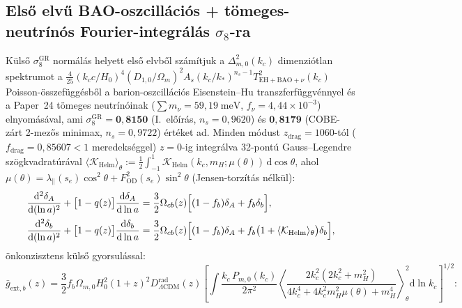 \documentclass[11pt,a4paper]{article}
\begin{document}
\subsection{Első elvű BAO-oszcillációs + tömeges-neutrínós Fourier-integrálás \texorpdfstring{$\sigma_8$}{sigma\_8}-ra}
Külső $\sigma_8^{\mathrm{GR}}$ normálás helyett első elvből számítjuk a $\Delta_{m,0}^2(k_c)$ dimenziótlan spektrumot a $\frac{4}{25}(k_c c/H_0)^4\allowbreak(D_{1,0}/\Omega_m)^2 A_s(k_c/k_*)^{n_s-1}T_{\mathrm{EH+BAO}+\nu}^2(k_c)$ Poisson-összefüggésből a barion-oszcillációs Eisenstein--Hu transzferfüggvénnyel \cite{EisensteinHu1998} és a Paper~24 tömeges neutrínóinak ($\sum m_\nu = 59{,}19\;\mathrm{meV}$, $f_\nu = 4{,}44\times 10^{-3}$) elnyomásával, ami $\sigma_8^{\mathrm{GR}} = \mathbf{0{,}8150}$ (I.~előírás, $n_s = 0{,}9620$) és $\mathbf{0{,}8179}$ (COBE-zárt 2-mezős minimax, $n_s = 0{,}9722$) értéket ad. Minden módust $z_{\mathrm{drag}} = 1060$-tól ($f_{\mathrm{drag}} = 0{,}85607 < 1$ meredekséggel) $z = 0$-ig integrálva 32-pontú Gauss--Legendre szögkvadratúrával $\langle\mathcal{K}_{\mathrm{Helm}}\rangle_\theta := \frac{1}{2}\int_{-1}^1 \mathcal{K}_{\mathrm{Helm}}(k_c, m_H; \mu(\theta))\,\mathrm{d}\cos\theta$, ahol $\mu(\theta) = \lambda_\parallel(s_e)\cos^2\theta + F_{\mathrm{OD}}^2(s_e)\sin^2\theta$ (Jensen-torzítás nélkül):
\begin{equation}
\begin{aligned}
  \frac{\mathrm{d}^2\delta_A}{\mathrm{d}(\ln a)^2} + \bigl[1 - q(z)\bigr]\frac{\mathrm{d}\delta_A}{\mathrm{d}\ln a} &= \frac{3}{2}\Omega_{cb}(z)\Bigl[(1 - f_b)\delta_A + f_b\delta_b\Bigr], \\
  \frac{\mathrm{d}^2\delta_b}{\mathrm{d}(\ln a)^2} + \bigl[1 - q(z)\bigr]\frac{\mathrm{d}\delta_b}{\mathrm{d}\ln a} &= \frac{3}{2}\Omega_{cb}(z)\Bigl[(1 - f_b)\delta_A + f_b\bigl(1 + \langle\mathcal{K}_{\mathrm{Helm}}\rangle_\theta\bigr)\delta_b\Bigr],
\end{aligned}
\label{eq:2fluid-ode}
\end{equation}
önkonzisztens külső gyorsulással:
\begin{equation}
  \bar{g}_{\mathrm{ext},b}(z) = \frac{3}{2}f_b\Omega_{m,0}H_0^2(1+z)^2 D_{\Lambda\mathrm{CDM}}^{\mathrm{rad}}(z)\left[\int \frac{k_c\,P_{m,0}(k_c)}{2\pi^2}\left\langle\frac{2k_c^2(2k_c^2 + m_H^2)}{4k_c^4 + 4k_c^2 m_H^2\mu(\theta) + m_H^4}\right\rangle_{\!\theta}^{\!2}\mathrm{d}\ln k_c\right]^{1/2}:
  \label{eq:self-consistent-barefe}
\end{equation}
\end{document}
